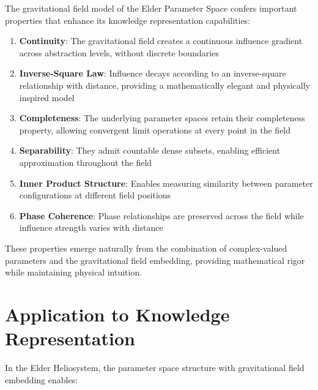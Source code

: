 The gravitational field model of the Elder Parameter Space confers important properties that enhance its knowledge representation capabilities:

\begin{enumerate}
    \item \textbf{Continuity}: The gravitational field creates a continuous influence gradient across abstraction levels, without discrete boundaries
    
    \item \textbf{Inverse-Square Law}: Influence decays according to an inverse-square relationship with distance, providing a mathematically elegant and physically inspired model
    
    \item \textbf{Completeness}: The underlying parameter spaces retain their completeness property, allowing convergent limit operations at every point in the field
    
    \item \textbf{Separability}: They admit countable dense subsets, enabling efficient approximation throughout the field
    
    \item \textbf{Inner Product Structure}: Enables measuring similarity between parameter configurations at different field positions
    
    \item \textbf{Phase Coherence}: Phase relationships are preserved across the field while influence strength varies with distance
\end{enumerate}

These properties emerge naturally from the combination of complex-valued parameters and the gravitational field embedding, providing mathematical rigor while maintaining physical intuition.

\section{Application to Knowledge Representation}

In the Elder Heliosystem, the parameter space structure with gravitational field embedding enables:

